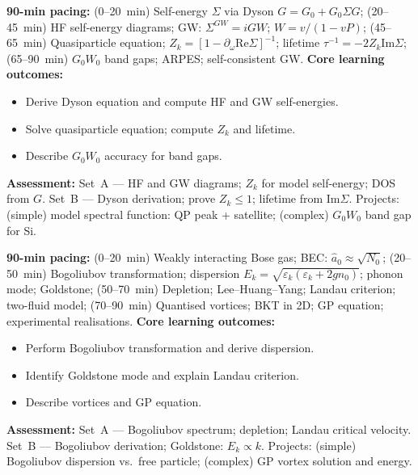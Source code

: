 \documentclass[11pt,a4paper]{article}
\begin{document}
\medskip

\begin{tcolorbox}[modulebox, title={Module~II.4 / L07: Green's Functions II --- Dyson Equation}]
\textbf{90-min pacing:} (0--20~min) Self-energy $\Sigma$ via Dyson $G=G_0+G_0\Sigma G$; (20--45~min) HF self-energy diagrams; GW: $\Sigma^{GW}=iGW$; $W=v/(1-vP)$; (45--65~min) Quasiparticle equation; $Z_k=[1-\partial_\omega\text{Re}\Sigma]^{-1}$; lifetime $\tau^{-1}=-2Z_k\text{Im}\Sigma$; (65--90~min) $G_0W_0$ band gaps; ARPES; self-consistent GW.
\medskip\textbf{Core learning outcomes:}
\begin{itemize}[leftmargin=1.4em,topsep=2pt,itemsep=1pt]
  \item Derive Dyson equation and compute HF and GW self-energies.
  \item Solve quasiparticle equation; compute $Z_k$ and lifetime.
  \item Describe $G_0W_0$ accuracy for band gaps.
\end{itemize}
\medskip\textbf{Assessment:}
Set~A --- HF and GW diagrams; $Z_k$ for model self-energy; DOS from $G$.
Set~B --- Dyson derivation; prove $Z_k\leq1$; lifetime from Im$\Sigma$.
Projects: (simple) model spectral function: QP peak + satellite; (complex) $G_0W_0$ band gap for Si.
\end{tcolorbox}

\medskip

\begin{tcolorbox}[modulebox, title={Module~II.4 / L08: Interacting Bosons and BEC}]
\textbf{90-min pacing:} (0--20~min) Weakly interacting Bose gas; BEC: $\hat{a}_0\approx\sqrt{N_0}$; (20--50~min) Bogoliubov transformation; dispersion $E_k=\sqrt{\varepsilon_k(\varepsilon_k+2gn_0)}$; phonon mode; Goldstone; (50--70~min) Depletion; Lee--Huang--Yang; Landau criterion; two-fluid model; (70--90~min) Quantised vortices; BKT in 2D; GP equation; experimental realisations.
\medskip\textbf{Core learning outcomes:}
\begin{itemize}[leftmargin=1.4em,topsep=2pt,itemsep=1pt]
  \item Perform Bogoliubov transformation and derive dispersion.
  \item Identify Goldstone mode and explain Landau criterion.
  \item Describe vortices and GP equation.
\end{itemize}
\medskip\textbf{Assessment:}
Set~A --- Bogoliubov spectrum; depletion; Landau critical velocity.
Set~B --- Bogoliubov derivation; Goldstone: $E_k\propto k$.
Projects: (simple) Bogoliubov dispersion vs.\ free particle; (complex) GP vortex solution and energy.
\end{tcolorbox}
\end{document}
